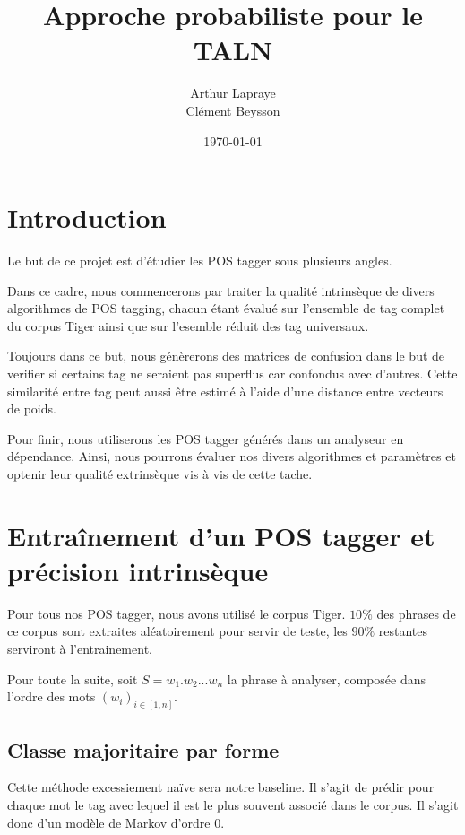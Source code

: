 \documentclass{article}
\title{Approche probabiliste pour le TALN}
\author{Arthur Lapraye\\Clément Beysson}
\date{\today}
\begin{document}
\maketitle


\tableofcontents

\newpage

\section{Introduction}

Le but de ce projet est d'étudier les POS tagger sous plusieurs angles. 

Dans ce cadre, nous commencerons par traiter la qualité intrinsèque de divers algorithmes de POS tagging, chacun étant évalué sur l'ensemble de tag complet du corpus Tiger ainsi que sur l'esemble réduit des tag universaux.

Toujours dans ce but, nous génèrerons des matrices de confusion dans le but de verifier si certains tag ne seraient pas superflus car confondus avec d'autres. Cette similarité entre tag peut aussi être estimé à l'aide d'une distance entre vecteurs de poids.

Pour finir, nous utiliserons les POS tagger générés dans un analyseur en dépendance. Ainsi, nous pourrons évaluer nos divers algorithmes et paramètres et optenir leur qualité extrinsèque vis à vis de cette tache.

\section{Entraînement d'un POS tagger et précision intrinsèque}

Pour tous nos POS tagger, nous avons utilisé le corpus Tiger. $10\%$ des phrases de ce corpus sont extraites aléatoirement pour servir de teste, les $90\%$ restantes serviront à l'entrainement.

Pour toute la suite, soit $S = w_1.w_2...w_n$ la phrase à analyser, composée dans l'ordre des mots $(w_i)_{i\in[1,n]}$.

\subsection{Classe majoritaire par forme}

Cette méthode excessiement naïve sera notre baseline. Il s'agit de prédir pour chaque mot le tag avec lequel il est le plus souvent associé dans le corpus. Il s'agit donc d'un modèle de Markov d'ordre 0. 
\end{document}
